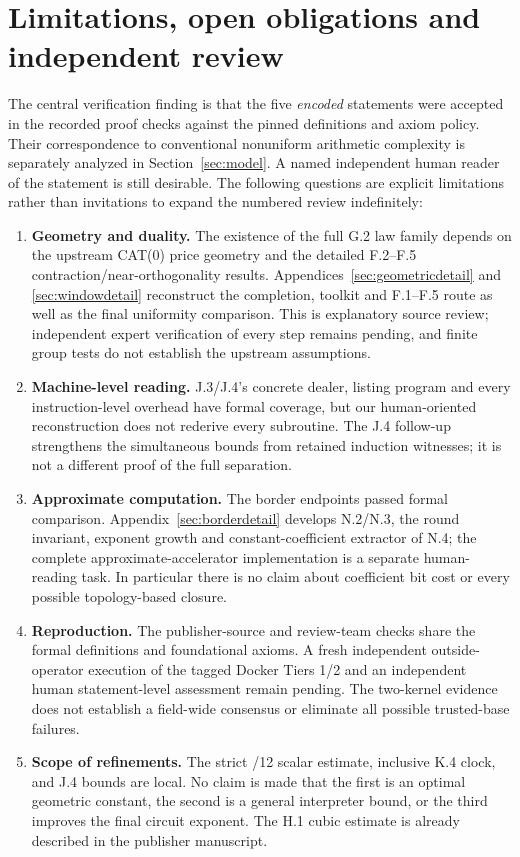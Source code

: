 \documentclass[11pt,letterpaper]{article}
\theoremstyle{definition}\newtheorem{definition}[theorem]{Definition}\newtheorem{example}[theorem]{Example}
\theoremstyle{remark}\newtheorem{remark}[theorem]{Remark}
\begin{document}
\section{Limitations, open obligations and independent review}\label{sec:limits}
The central verification finding is that the five \emph{encoded} statements were accepted in the recorded proof checks against the pinned definitions and axiom policy. Their correspondence to conventional nonuniform arithmetic complexity is separately analyzed in Section~\ref{sec:model}. A named independent human reader of the statement is still desirable. The following questions are explicit limitations rather than invitations to expand the numbered review indefinitely:
\begin{enumerate}[leftmargin=1.7em]
\item \textbf{Geometry and duality.} The existence of the full G.2 law family depends on the upstream CAT(0) price geometry and the detailed F.2--F.5 contraction/near-orthogonality results. Appendices~\ref{sec:geometricdetail} and \ref{sec:windowdetail} reconstruct the completion, toolkit and F.1--F.5 route as well as the final uniformity comparison. This is explanatory source review; independent expert verification of every step remains pending, and finite group tests do not establish the upstream assumptions.
\item \textbf{Machine-level reading.} J.3/J.4's concrete dealer, listing program and every instruction-level overhead have formal coverage, but our human-oriented reconstruction does not rederive every subroutine. The J.4 follow-up strengthens the simultaneous bounds from retained induction witnesses; it is not a different proof of the full separation.
\item \textbf{Approximate computation.} The border endpoints passed formal comparison. Appendix~\ref{sec:borderdetail} develops N.2/N.3, the round invariant, exponent growth and constant-coefficient extractor of N.4; the complete approximate-accelerator implementation is a separate human-reading task. In particular there is no claim about coefficient bit cost or every possible topology-based closure.
\item \textbf{Reproduction.} The publisher-source and review-team checks share the formal definitions and foundational axioms. A fresh independent outside-operator execution of the tagged Docker Tiers 1/2 and an independent human statement-level assessment remain pending. The two-kernel evidence does not establish a field-wide consensus or eliminate all possible trusted-base failures.
\item \textbf{Scope of refinements.} The strict /12 scalar estimate, inclusive K.4 clock, and J.4 bounds are local. No claim is made that the first is an optimal geometric constant, the second is a general interpreter bound, or the third improves the final circuit exponent. The H.1 cubic estimate is already described in the publisher manuscript.
\end{enumerate}
\end{document}
